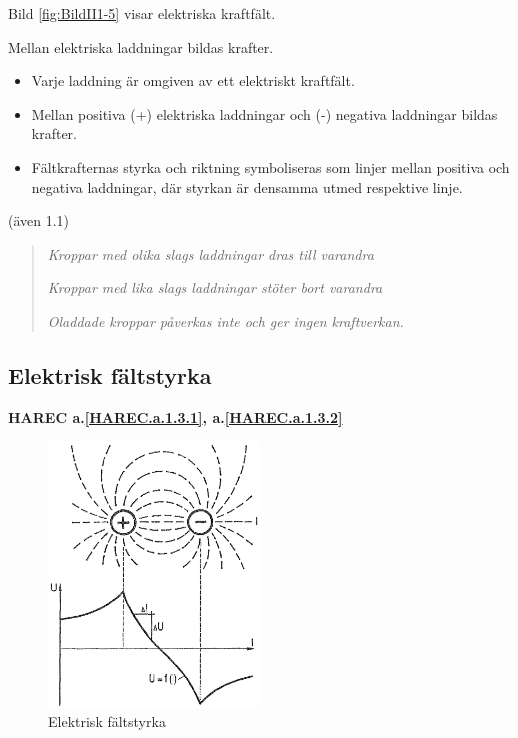 Bild \ref{fig:BildII1-5} visar elektriska kraftfält.

Mellan elektriska laddningar bildas krafter.

\begin{itemize}
  \item Varje laddning är omgiven av ett elektriskt kraftfält.
  \item Mellan positiva (+) elektriska laddningar och (-) negativa laddningar
  bildas krafter.
  \item Fältkrafternas styrka och riktning symboliseras som linjer mellan
  positiva och negativa laddningar, där styrkan är densamma utmed respektive
  linje.
\end{itemize}

(även 1.1)

\begin{quote}
\emph{Kroppar med olika slags laddningar dras till varandra}

\emph{Kroppar med lika slags laddningar stöter bort varandra}

\emph{Oladdade kroppar påverkas inte och ger ingen kraftverkan.}
\end{quote}

\subsection{Elektrisk fältstyrka}
\textbf{HAREC a.\ref{HAREC.a.1.3.1}, a.\ref{HAREC.a.1.3.2}\label{myHAREC.a.1.3.1}\label{myHAREC.a.1.3.2}}

\begin{figure}
  \includegraphics[width=0.5\textwidth]{images/cropped_pdfs/bild_2_1-06.pdf}
  \caption{Elektrisk fältstyrka}
  \label{fig:BildII1-6}
\end{figure}


